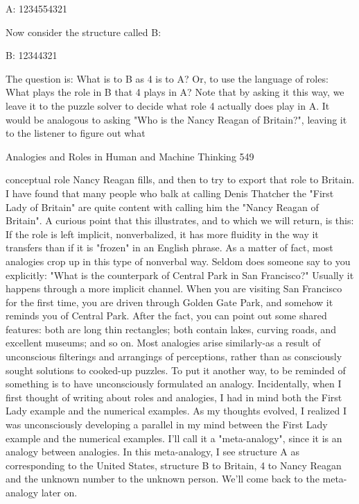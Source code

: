               A: 1234554321

Now consider the structure called B:

              B:    12344321

The question is: What is to B as 4 is to A? Or, to use the language of roles: What plays
the role in B that 4 plays in A?
        Note that by asking it this way, we leave it to the puzzle solver to decide what
role 4 actually does play in A. It would be analogous to asking "Who is the Nancy
Reagan of Britain?", leaving it to the listener to figure out what




Analogies and Roles in Human and Machine Thinking                                   549

conceptual role Nancy Reagan fills, and then to try to export that role to Britain. I
have found that many people who balk at calling Denis Thatcher the "First Lady of
Britain" are quite content with calling him the "Nancy Reagan of Britain". A curious
point that this illustrates, and to which we will return, is this: If the role is left implicit,
nonverbalized, it has more fluidity in the way it transfers than if it is "frozen" in an
English phrase.
        As a matter of fact, most analogies crop up in this type of nonverbal way.
Seldom does someone say to you explicitly: "What is the counterpark of Central Park
in San Francisco?" Usually it happens through a more implicit channel. When you are
visiting San Francisco for the first time, you are driven through Golden Gate Park,
and somehow it reminds you of Central Park. After the fact, you can point out some
shared features: both are long thin rectangles; both contain lakes, curving roads, and
excellent museums; and so on. Most analogies arise similarly-as a result of
unconscious filterings and arrangings of perceptions, rather than as consciously
sought solutions to cooked-up puzzles. To put it another way, to be reminded of
something is to have unconsciously formulated an analogy.
        Incidentally, when I first thought of writing about roles and analogies, I had in
mind both the First Lady example and the numerical examples. As my thoughts
evolved, I realized I was unconsciously developing a parallel in my mind between the
First Lady example and the numerical examples. I'll call it a "meta-analogy", since it
is an analogy between analogies. In this meta-analogy, I see structure A as
corresponding to the United States, structure B to Britain, 4 to Nancy Reagan and the
unknown number to the unknown person. We'll come back to the meta-analogy later
on.

